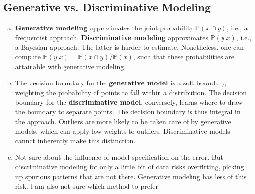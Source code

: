 \documentclass{article}
\begin{document}
\subsection{Generative vs. Discriminative Modeling}
\begin{enumerate}[(a)]
    \item \textbf{Generative modeling} approximates the joint probability $\mathbb{P}(x\cap y)$, i.e., a frequentist approach. \textbf{Discriminative modeling} approximates $\mathbb{P}(y|x)$, i.e., a Bayesian approach. The latter is harder to estimate. Nonetheless, one can compute $\mathbb{P}(y|x)=\mathbb{P}(x\cap y)/\mathbb{P}(x)$, such that these probabilities are attainable with generative modeling.
    \item The decision boundary for the \textbf{generative model} is a soft boundary, weighting the probability of points to fall within a distribution. The decision boundary for the \textbf{discriminative model}, conversely, learns where to draw the boundary to separate points. The decision boundary is thus integral in the approach. Outliers are more likely to be taken care of by generative models, which can apply low weights to outliers. Discriminative models cannot inherently make this distinction.
    \item Not sure about the influence of model specification on the error. But discriminative modeling for only a little bit of data risks overfitting, picking up spurious patterns that are not there. Generative modeling has less of this risk. I am also not sure which method to prefer. 
\end{enumerate}
\end{document}
